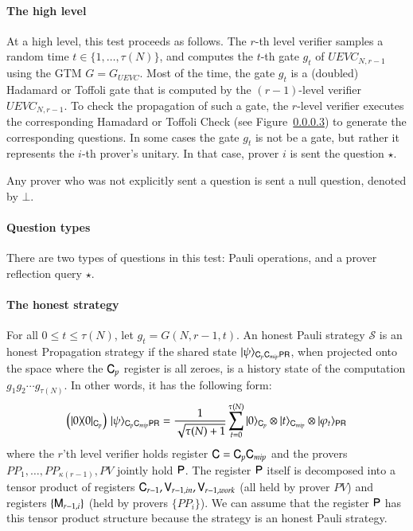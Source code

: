\paragraph{The high level}  At a high level, this test  proceeds as follows. The $r$-th level verifier samples a random time $t \in \{1,\ldots,\tau(N)\}$, and computes the $t$-th gate $g_t$ of $UEVC_{N,r-1}$ using the GTM $G = G_{UEVC}$. Most of the time, the gate $g_t$ is a (doubled) Hadamard or Toffoli gate that is computed by the $(r-1)$-level verifier $UEVC_{N,r-1}$. To check the propagation of such a gate, the $r$-level verifier executes the corresponding Hamadard or Toffoli Check (see Figure~\ref{}) to generate the corresponding questions. %
In some cases the gate $g_t$ is not be a gate, but rather it represents the $i$-th prover's unitary. In that case, prover $i$ is sent the question $\star$.  

Any prover who was not explicitly sent a question is sent a null question, denoted by $\bot$.

\paragraph{Question types} There are two types of questions in this test: Pauli operations, and a prover reflection query $\star$.


\paragraph{The honest strategy} For all $0 \leq t \leq \tau(N)$, let $g_t = G(N,r-1,t)$. An honest Pauli strategy $\mathcal{S}$ is an honest Propagation strategy if the shared state $|\psi\rangle_{{\mathsf{C}}_p {\mathsf{C}}_{mip} {\mathsf{P}} {\mathsf{R}}}$, when projected onto the space where the ${\mathsf{C}}_p$ register is all zeroes, is a history state of the computation $g_1g_2\cdots g_{\tau(N)}$. In other words, it has the following form:
\[
	\left( |0\rangle\! \langle 0|_{{\mathsf{C}}_p} \right) \, |\psi\rangle_{{\mathsf{C}}_p {\mathsf{C}}_{mip} {\mathsf{P}} {\mathsf{R}}} = \frac{1}{\sqrt{\tau(N) + 1}} \sum_{t = 0}^{\tau(N)} |0\rangle_{{\mathsf{C}}_p} \otimes |t\rangle_{{\mathsf{C}}_{mip}} \otimes |\varphi_t\rangle_{{\mathsf{P}} {\mathsf{R}}}
\]
where the $r$'th level verifier holds register ${\mathsf{C}} = {\mathsf{C}}_p {\mathsf{C}}_{mip}$ and the provers $PP_1,\ldots,PP_{\kappa(r-1)},PV$ jointly hold ${\mathsf{P}}$. The register ${\mathsf{P}}$ itself is decomposed into a tensor product of registers ${\mathsf{C}}_{r-1}, {\mathsf{V}}_{r-1,in}, {\mathsf{V}}_{r-1,work}$ (all held by prover $PV$) and registers $\{ {\mathsf{M}}_{r-1,i} \}$ (held by provers $\{ PP_i \}$). We can assume that the register ${\mathsf{P}}$ has this tensor product structure because the strategy is an honest Pauli strategy. %

